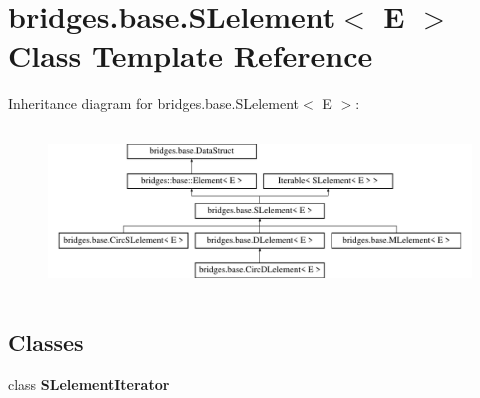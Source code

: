 \hypertarget{classbridges_1_1base_1_1_s_lelement}{}\section{bridges.\+base.\+S\+Lelement$<$ E $>$ Class Template Reference}
\label{classbridges_1_1base_1_1_s_lelement}
Inheritance diagram for bridges.\+base.\+S\+Lelement$<$ E $>$\+:\begin{figure}[H]
\begin{center}
\leavevmode
\includegraphics[height=4.402516cm]{classbridges_1_1base_1_1_s_lelement}
\end{center}
\end{figure}
\subsection*{Classes}
\begin{DoxyCompactItemize}
\item 
class {\bfseries S\+Lelement\+Iterator}
\end{DoxyCompactItemize}
